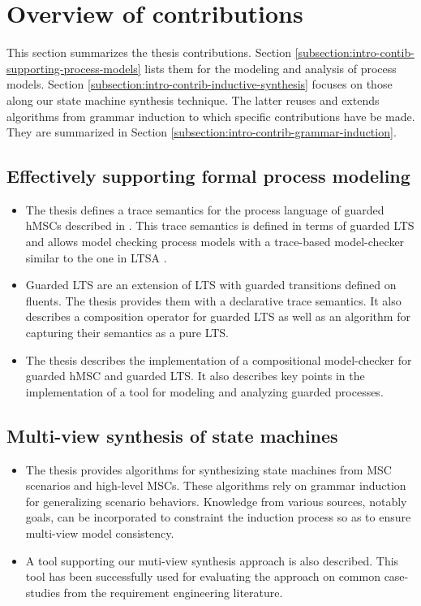 \section{Overview of contributions\label{section:intro-contributions}}

This section summarizes the thesis contributions. Section \ref{subsection:intro-contib-supporting-process-models} lists them for the modeling and analysis of process models. Section \ref{subsection:intro-contrib-inductive-synthesis} focuses on those along our state machine synthesis technique. The latter reuses and extends algorithms from grammar induction to which specific contributions have be made. They are summarized in Section \ref{subsection:intro-contrib-grammar-induction}. 


\subsection{Effectively supporting formal process modeling\label{subsection:intro-contib-supporting-process-models}}

\begin{itemize}
\item The thesis defines a trace semantics for the process language of guarded hMSCs described in \cite{Damas:2011}. This trace semantics is defined in terms of guarded LTS and allows model checking process models with a trace-based model-checker similar to the one in LTSA \cite{Magee:1999}. 
\item Guarded LTS are an extension of LTS with guarded transitions defined on fluents. The thesis provides them with a declarative trace semantics. It also describes a composition operator for guarded LTS as well as an algorithm for capturing their semantics as a pure LTS.
\item The thesis describes the implementation of a compositional model-checker for guarded hMSC and guarded LTS. It also describes key points in the implementation of a tool for modeling and analyzing guarded processes. 
\end{itemize}


\subsection{Multi-view synthesis of state machines\label{subsection:intro-contrib-inductive-synthesis}}
\begin{itemize}
\item The thesis provides algorithms for synthesizing state machines from MSC scenarios and high-level MSCs. These algorithms rely on grammar induction for generalizing scenario behaviors. Knowledge from various sources, notably goals, can be incorporated to constraint the induction process so as to ensure multi-view model consistency.
\item A tool supporting our muti-view synthesis approach is also described. This tool has been successfully used for evaluating the approach on common case-studies from the requirement engineering literature.
\end{itemize}

